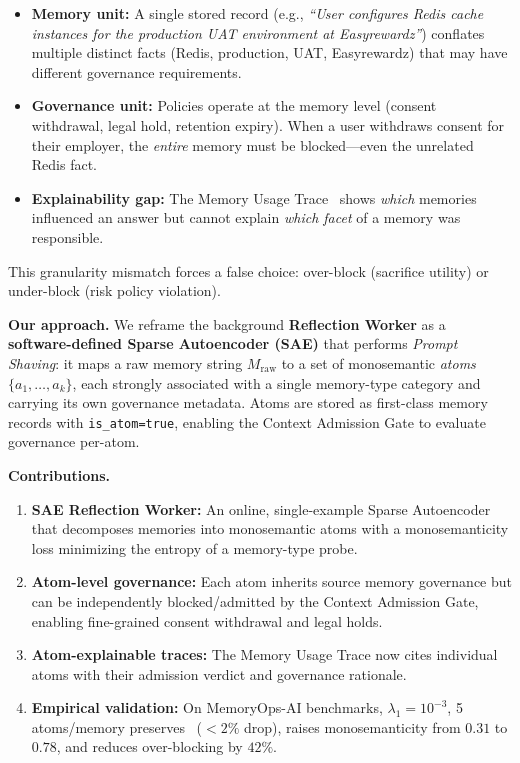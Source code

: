 \documentclass[11pt]{article}
\makeatletter
\newcommand{\mrr}{\text{MRR@10}}
\makeatother
\begin{document}
\begin{itemize}
  \item \textbf{Memory unit:} A single stored record (e.g., \emph{``User configures Redis cache instances for the production UAT environment at Easyrewardz''}) conflates multiple distinct facts (Redis, production, UAT, Easyrewardz) that may have different governance requirements.
  \item \textbf{Governance unit:} Policies operate at the memory level (consent withdrawal, legal hold, retention expiry). When a user withdraws consent for their employer, the \emph{entire} memory must be blocked---even the unrelated Redis fact.
  \item \textbf{Explainability gap:} The Memory Usage Trace~\cite{adr017} shows \emph{which} memories influenced an answer but cannot explain \emph{which facet} of a memory was responsible.
\end{itemize}

This granularity mismatch forces a false choice: over-block (sacrifice utility) or under-block (risk policy violation).

\vspace{0.5em}
\noindent\textbf{Our approach.} We reframe the background \textbf{Reflection Worker} as a \textbf{software-defined Sparse Autoencoder (SAE)} that performs \emph{Prompt Shaving}: it maps a raw memory string $M_{\text{raw}}$ to a set of monosemantic \emph{atoms} $\{a_1,\dots,a_k\}$, each strongly associated with a single memory-type category and carrying its own governance metadata. Atoms are stored as first-class memory records with \texttt{is\_atom=true}, enabling the Context Admission Gate to evaluate governance per-atom.

\vspace{0.5em}
\noindent\textbf{Contributions.}
\begin{enumerate}
  \item \textbf{SAE Reflection Worker:} An online, single-example Sparse Autoencoder that decomposes memories into monosemantic atoms with a monosemanticity loss minimizing the entropy of a memory-type probe.
  \item \textbf{Atom-level governance:} Each atom inherits source memory governance but can be independently blocked/admitted by the Context Admission Gate, enabling fine-grained consent withdrawal and legal holds.
  \item \textbf{Atom-explainable traces:} The Memory Usage Trace now cites individual atoms with their admission verdict and governance rationale.
  \item \textbf{Empirical validation:} On MemoryOps-AI benchmarks, $\lambda_1=10^{-3}$, 5 atoms/memory preserves \mrr\ ($<2\%$ drop), raises monosemanticity from $0.31$ to $0.78$, and reduces over-blocking by $42\%$.
\end{enumerate}
\end{document}
